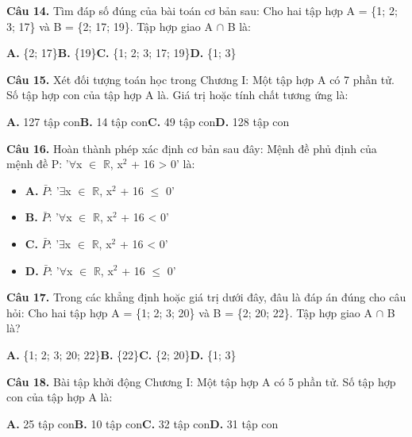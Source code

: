 \documentclass[11pt,a4paper]{article}
\begin{document}
\textbf{\color{primary} Câu 14.} Tìm đáp số đúng của bài toán cơ bản sau: Cho hai tập hợp A = \{1; 2; 3; 17\} và B = \{2; 17; 19\}. Tập hợp giao A $\cap$ B là:\par
\hspace*{1.5em}\textbf{A.} \{2; 17\}\quad\quad \textbf{B.} \{19\}\quad\quad \textbf{C.} \{1; 2; 3; 17; 19\}\quad\quad \textbf{D.} \{1; 3\}\par\vspace{2pt}
\textbf{\color{primary} Câu 15.} Xét đối tượng toán học trong Chương I: Một tập hợp A có 7 phần tử. Số tập hợp con của tập hợp A là. Giá trị hoặc tính chất tương ứng là:\par
\hspace*{1.5em}\textbf{A.} 127 tập con\quad\quad \textbf{B.} 14 tập con\quad\quad \textbf{C.} 49 tập con\quad\quad \textbf{D.} 128 tập con\par\vspace{2pt}
\textbf{\color{primary} Câu 16.} Hoàn thành phép xác định cơ bản sau đây: Mệnh đề phủ định của mệnh đề P: '$\forall$x $\in$ $\mathbb{R}$, x$^2$ + 16 > 0' là:\par
\begin{itemize}\setlength{\itemsep}{1pt}\setlength{\parskip}{0pt}
  \item[] \textbf{A.} $\bar{P}$: '$\exists$x $\in$ $\mathbb{R}$, x$^2$ + 16 $\le$ 0'
  \item[] \textbf{B.} $\bar{P}$: '$\forall$x $\in$ $\mathbb{R}$, x$^2$ + 16 < 0'
  \item[] \textbf{C.} $\bar{P}$: '$\exists$x $\in$ $\mathbb{R}$, x$^2$ + 16 < 0'
  \item[] \textbf{D.} $\bar{P}$: '$\forall$x $\in$ $\mathbb{R}$, x$^2$ + 16 $\le$ 0'
\end{itemize}\vspace{2pt}
\textbf{\color{primary} Câu 17.} Trong các khẳng định hoặc giá trị dưới đây, đâu là đáp án đúng cho câu hỏi: Cho hai tập hợp A = \{1; 2; 3; 20\} và B = \{2; 20; 22\}. Tập hợp giao A $\cap$ B là?\par
\hspace*{1.5em}\textbf{A.} \{1; 2; 3; 20; 22\}\quad\quad \textbf{B.} \{22\}\quad\quad \textbf{C.} \{2; 20\}\quad\quad \textbf{D.} \{1; 3\}\par\vspace{2pt}
\textbf{\color{primary} Câu 18.} Bài tập khởi động Chương I: Một tập hợp A có 5 phần tử. Số tập hợp con của tập hợp A là:\par
\hspace*{1.5em}\textbf{A.} 25 tập con\quad\quad \textbf{B.} 10 tập con\quad\quad \textbf{C.} 32 tập con\quad\quad \textbf{D.} 31 tập con\par\vspace{2pt}
\end{document}

